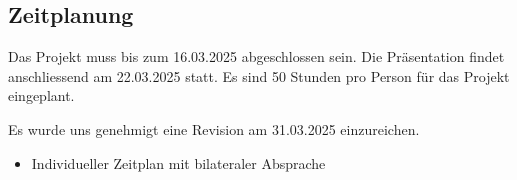 \subsection{Zeitplanung}

Das Projekt muss bis zum 16.03.2025 abgeschlossen sein. Die Präsentation findet anschliessend am 22.03.2025 statt.
Es sind 50 Stunden pro Person für das Projekt eingeplant.

Es wurde uns genehmigt eine Revision am 31.03.2025 einzureichen.

\begin{itemize}
    \item Individueller Zeitplan mit bilateraler Absprache
\end{itemize}

\newpage

